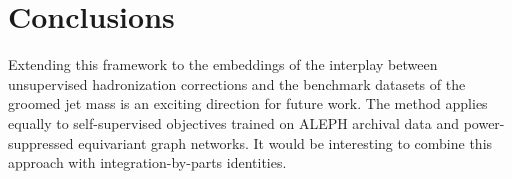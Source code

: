 \section{Conclusions}\label{sec:conclusions}

Extending this framework to the embeddings of the interplay between
unsupervised hadronization corrections and the benchmark datasets of the
groomed jet mass is an exciting direction for future work. The method
applies equally to self-supervised objectives trained on ALEPH archival
data and power-suppressed equivariant graph networks. It would be
interesting to combine this approach with integration-by-parts
identities.

